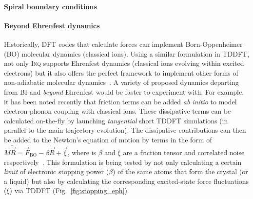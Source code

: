 
\paragraph{Spiral boundary conditions}

\paragraph{Beyond Ehrenfest dynamics}

Historically, DFT codes that calculate forces can implement Born-Oppenheimer (BO) molecular dynamics (classical ions).
Using a similar formulation in TDDFT, not only \textsc{Inq} supports Ehrenfest dynamics (classical ions evolving within excited electrons) but it also offers the perfect framework to implement other forms of non-adiabatic molecular dynamics~\cite{Tapavicza2013,Curchod2018}. 
A variety of proposed dynamics departing from BI and \emph{beyond} Ehrenfest would be faster to experiment with.
For example, it has been noted recently that friction terms can be added \emph{ab initio} to model electron-phonon coupling with classical ions.
These dissipative terms can be calculated on-the-fly by launching \emph{tangential} short TDDFT simulations (in parallel to the main trajectory evolution).
The dissipative contributions can then be added to the Newton's equation of motion by terms in the form of \(M \ddot{\vec{R}} = \vec{F}_\text{BO} - \beta\dot{\vec{R}} + \vec{\xi}\), where is \(\beta\) and \(\xi\) are a friction tensor and correlated noise respectively~\cite{Tamm2018}.
This formulation is being tested by not only calculating a certain \emph{limit} of electronic stopping power (\(\beta\)) of the same atoms that form the crystal (or a liquid) but also by calculating the corresponding excited-state force fluctuations (\(\xi\)) via TDDFT (Fig.~\ref{fig:stopping_eph}).

